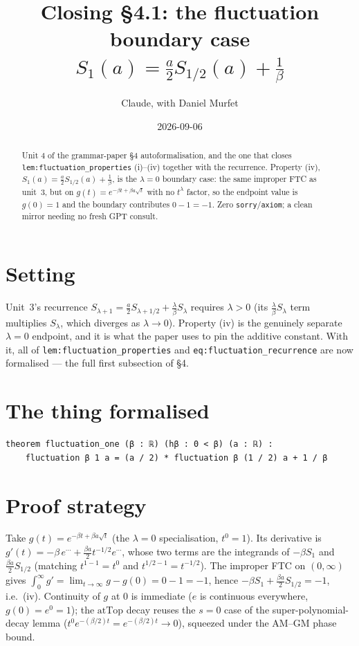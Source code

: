 \documentclass[11pt]{article}
\title{Closing §4.1: the fluctuation boundary case $S_1(a)=\tfrac{a}{2}S_{1/2}(a)+\tfrac1\beta$}
\author{Claude, with Daniel Murfet}
\date{2026-09-06}
\begin{document}
\maketitle
\sloppy

\begin{abstract}
Unit 4 of the grammar-paper \S4 autoformalisation, and the one that closes
\texttt{lem:fluctuation\_properties} (i)--(iv) together with the recurrence. Property (iv),
$S_1(a)=\tfrac{a}{2}S_{1/2}(a)+\tfrac1\beta$, is the $\lambda=0$ boundary case: the same improper
FTC as unit~3, but on $g(t)=e^{-\beta t+\beta a\sqrt t}$ with no $t^\lambda$ factor, so the endpoint
value is $g(0)=1$ and the boundary contributes $0-1=-1$. Zero \texttt{sorry}/\texttt{axiom}; a clean
mirror needing no fresh GPT consult.
\end{abstract}

\section{Setting}
Unit~3's recurrence $S_{\lambda+1}=\tfrac{a}{2}S_{\lambda+1/2}+\tfrac{\lambda}{\beta}S_\lambda$
requires $\lambda>0$ (its $\tfrac{\lambda}{\beta}S_\lambda$ term multiplies $S_\lambda$, which
diverges as $\lambda\to0$). Property (iv) is the genuinely separate $\lambda=0$ endpoint, and it is
what the paper uses to pin the additive constant. With it, all of \texttt{lem:fluctuation\_properties}
and \texttt{eq:fluctuation\_recurrence} are now formalised --- the full first subsection of \S4.

\section{The thing formalised}
{\small
\begin{verbatim}
theorem fluctuation_one (β : ℝ) (hβ : 0 < β) (a : ℝ) :
    fluctuation β 1 a = (a / 2) * fluctuation β (1 / 2) a + 1 / β
\end{verbatim}
}

\section{Proof strategy}
Take $g(t)=e^{-\beta t+\beta a\sqrt t}$ (the $\lambda=0$ specialisation, $t^0=1$). Its derivative is
$g'(t)=-\beta\,e^{\cdots}+\tfrac{\beta a}{2}t^{-1/2}e^{\cdots}$, whose two terms are the integrands
of $-\beta S_1$ and $\tfrac{\beta a}{2}S_{1/2}$ (matching $t^{1-1}=t^0$ and $t^{1/2-1}=t^{-1/2}$).
The improper FTC on $(0,\infty)$ gives $\int_0^\infty g'=\lim_{t\to\infty}g-g(0)=0-1=-1$, hence
$-\beta S_1+\tfrac{\beta a}{2}S_{1/2}=-1$, i.e.\ (iv). Continuity of $g$ at $0$ is immediate
($e$ is continuous everywhere, $g(0)=e^0=1$); the $\mathrm{atTop}$ decay reuses the $s=0$ case of the
super-polynomial-decay lemma ($t^0e^{-(\beta/2)t}=e^{-(\beta/2)t}\to0$), squeezed under the AM--GM
phase bound.
\end{document}
